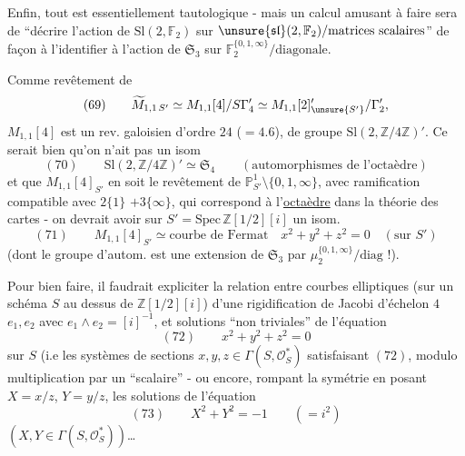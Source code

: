 
Enfin, tout est essentiellement tautologique - mais un calcul amusant à
faire sera de ``décrire l'action de $\mathrm{Sl}(2,\mathbb F_2)$ sur
$\unsure{\mathfrak{sl}}(2,\mathbb F_2)/\text{matrices scalaires}$''
de façon à l'identifier à l'action de $\mathfrak S_3$ sur
$\mathbb F_2^{\{0,1,\infty\}}/\text{diagonale}$.

Comme revêtement de 
\[
(69)\qquad
\widetilde M_{1,1\,S'}
\simeq M_{1,1}[4]/S\Gamma'_4
\simeq M_{1,1}[2]'_{\unsure{S'}}/\Gamma'_2,
\]
$M_{1,1}[4]$ est un rev. galoisien d'ordre $24$ ($=4.6$),
de groupe $\mathrm{Sl}(2,\mathbb Z/4\mathbb Z)'$.
 Ce serait bien  qu'on n'ait pas un isom
\[
(70)\qquad
\mathrm{Sl}(2,\mathbb Z/4\mathbb Z)'
\simeq\mathfrak S_4
\qquad
(\text{automorphismes de l'octaèdre})
\]
et que $M_{1,1}[4]_{S'}$ en soit le revêtement 
de $\mathbb P^1_{S'}\setminus\{0,1,\infty\}$, avec
ramification compatible avec
$2\{1\}$  $+3\{\infty\}$,
qui correspond à l'\uline{octaèdre} \unsure{\&} dans la théorie des
cartes - on devrait avoir sur
$S'=\mathrm{Spec}\,\mathbb Z[1/2][i]$
un isom. 
\[
(71)\qquad
M_{1,1}[4]_{S'}\simeq
\text{courbe de Fermat}
\quad
x^2+y^2+z^2=0
\quad(\text{sur }S')
\]
(dont le groupe d'autom. est  une extension de
$\mathfrak S_3$ par
$\mu_2^{\{0,1,\infty\}}/\mathrm{diag}$ !).


Pour bien faire, il faudrait expliciter la relation entre courbes
elliptiques  (sur un schéma $S$ au dessus de
$\mathbb Z[1/2][i]$)  d'une rigidification de Jacobi
d'échelon $4$ $e_1,e_2$ avec $e_1\wedge e_2=[i]^{-1}$, et solutions
``non triviales'' de l'équation
\[
(72)\qquad x^2+y^2+z^2=0
\]
sur $S$ (i.e les systèmes de sections
$x,y,z\in\Gamma(S,\mathcal O_S^*)$ satisfaisant $(72)$, modulo
multiplication par un ``scalaire''
- ou encore, rompant la symétrie en posant
$X=x/z$, $Y=y/z$, 
les solutions de l'équation
\[
(73)\qquad X^2+Y^2=-1\qquad(=i^2)
\]
$(X,Y\in\Gamma(S,\mathcal O_S^*))$\ldots

